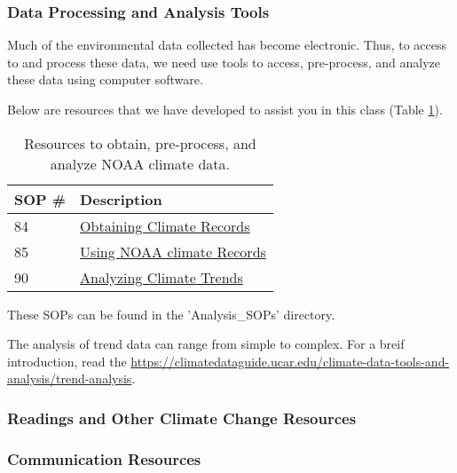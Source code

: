 \documentclass{article}\usepackage[]{graphicx}\usepackage[]{color}
\begin{document}
\subsubsection{Data Processing and Analysis Tools}

Much of the environmental data collected has become electronic. Thus, to access to and process these data, we need use tools to access, pre-process, and analyze these data using computer software. 

Below are resources that we have developed to assist you in this class (Table \ref{tab:tools}).

\begin{table}[h]

\caption{Resources to obtain, pre-process, and analyze NOAA climate data.}\label{tab:tools}
\centering
\begin{tabular}{ll}\hline
SOP \#    & Description                                 \\\hline\hline
84        & \href{https://github.com/marclos/Climate_Change_Narratives/raw/master/Analysis_SOPs/SOP84_Obtaining_Climate_Records.pdf}{Obtaining Climate Records}\\
85        & \href{https://github.com/marclos/Climate_Change_Narratives/raw/master/Analysis_SOPs/SOP85_Using_NOAA_Climate_Records.pdf}{Using NOAA climate Records}\\
90        & \href{https://github.com/marclos/Climate_Change_Narratives/raw/master/Analysis_SOPs/SOP90_Analyzing_Trends.pdf}{Analyzing Climate Trends} \\ \hline

\end{tabular}
\end{table}

These SOPs can be found in the 'Analysis\_SOPs' directory.

The analysis of trend data can range from simple to complex. For a breif introduction, read the \url{https://climatedataguide.ucar.edu/climate-data-tools-and-analysis/trend-analysis}.

\subsubsection{Readings and Other Climate Change Resources}



\subsubsection{Communication Resources}
\end{document}
